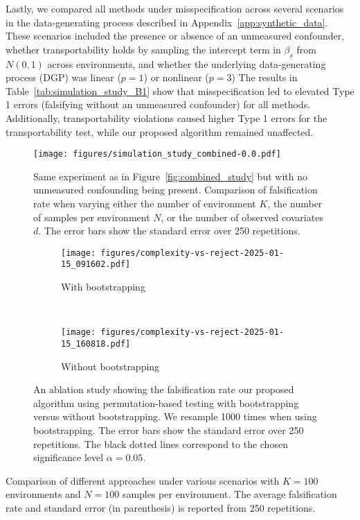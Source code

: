 \documentclass{article}
\begin{document}
Lastly, we compared all methods under misspecification across several scenarios in the data-generating process described in Appendix~\ref{app:synthetic_data}. These scenarios included the presence or absence of an unmeasured confounder, whether transportability holds by sampling the intercept term in $\beta_s$ from $N(0,1)$ across environments, and whether the underlying data-generating process (DGP) was linear ($p=1$) or nonlinear ($p=3$) The results in Table~\ref{tab:simulation_study_B1} show that misspecification led to elevated Type 1 errors (falsifying without an unmeasured confounder) for all methods. Additionally, transportability violations caused higher Type 1 errors for the transportability test, while our proposed algorithm remained unaffected.

\begin{figure}[ht]
    \centering
    \texttt{[image: figures/simulation\_study\_combined-0.0.pdf]}
    \caption{Same experiment as in Figure~\ref{fig:combined_study} but with no unmeasured confounding being present. Comparison of falsification rate  when varying either the number of environment $K$, the number of samples per environment $N$, or the number of observed covariates $d$. The error bars show the standard error over 250 repetitions.}
\label{fig:combined_study_no_confounders}
\end{figure}

\begin{figure*}[ht]
     \centering
     \begin{subfigure}{0.35\textwidth}
         \centering
          \texttt{[image: figures/complexity-vs-reject-2025-01-15\_091602.pdf]}
          \caption{With bootstrapping}\label{fig:detection_vs_complexity_bootstrapping}
     \end{subfigure}
     ~
     \begin{subfigure}{0.35\textwidth}
         \centering
         \texttt{[image: figures/complexity-vs-reject-2025-01-15\_160818.pdf]}
         \caption{Without bootstrapping}
         \label{fig:detection_vs_complexity_no_bootstrapping}
     \end{subfigure}
     \caption{An ablation study showing the falsification rate our proposed algorithm using permutation-based testing with bootstrapping versus without bootstrapping. We resample 1000 times when using bootstrapping. The error bars show the standard error over 250 repetitions. The black dotted lines correspond to the chosen significance level $\alpha=0.05$. }
     \label{fig:ablation_study_bootstrapping}
\end{figure*}


\begin{table}[t]
    \centering
    \caption{Comparison of different approaches under various scenarios with $K=100$ environments and $N=100$ samples per environment. The average falsification rate and standard error (in parenthesis) is reported from 250 repetitions.}
    \label{tab:simulation_study_B1}
    
\end{table}
\end{document}
